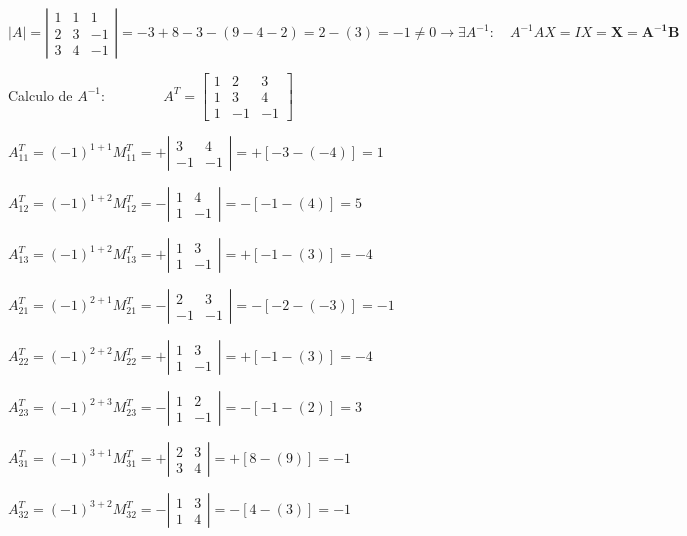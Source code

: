 \begin{proofw}
$|A|=\left| \begin{matrix} 1&1&1\\2&3&-1\\3&4&-1 \end{matrix} \right| = -3+8-3-(9-4-2)=2-(3)=-1\neq 0 \to \exists A^{-1}: \quad A^{-1}AX=IX=\boldsymbol{X=A^{-1}B}$

Calculo de $A^{-1}: \qquad \qquad A^T=\left[ \begin{matrix} 1&2&3\\1&3&4\\1&-1&-1 \end{matrix} \right]$

$A^T_{11}=(-1)^{1+1}M^T_{11}=+\left| \begin{matrix} 3&4\\-1&-1 \end{matrix} \right|=
+[ -3- (-4 )]=1 $

$A^T_{12}=(-1)^{1+2}M^T_{12}=-\left| \begin{matrix} 1&4\\1&-1 \end{matrix} \right|=
-[ -1- (4 )]=5 $

$A^T_{13}=(-1)^{1+2}M^T_{13}=+\left| \begin{matrix} 1&3\\1&-1 \end{matrix} \right|=
+[ -1- (3 )]= -4$

$A^T_{21}=(-1)^{2+1}M^T_{21}=-\left| \begin{matrix} 2&3\\-1&-1 \end{matrix} \right|=
-[ -2- (-3 )]=-1 $

$A^T_{22}=(-1)^{2+2}M^T_{22}=+\left| \begin{matrix} 1&3\\1&-1 \end{matrix} \right|=
+[ -1- ( 3)]=-4 $

$A^T_{23}=(-1)^{2+3}M^T_{23}=-\left| \begin{matrix} 1&2\\1&-1 \end{matrix} \right|=
-[-1 - (2 )]= 3$

$A^T_{31}=(-1)^{3+1}M^T_{31}=+\left| \begin{matrix} 2&3\\3&4 \end{matrix} \right|=
+[8 - (9 )]=-1 $

$A^T_{32}=(-1)^{3+2}M^T_{32}=-\left| \begin{matrix} 1&3\\1&4 \end{matrix} \right|=
-[ 4- (3 )]=-1 $


\end{proofw}
